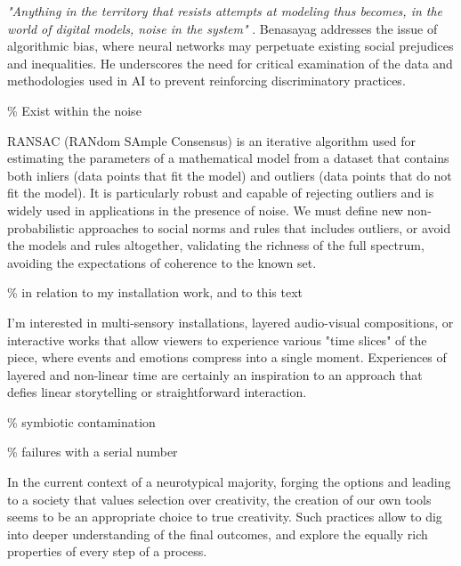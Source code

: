 \textit{"Anything in the territory that resists attempts at modeling thus becomes, in the world of digital models, noise in the system"} \citep{benasayag2019}. Benasayag addresses the issue of algorithmic bias, where neural networks may perpetuate existing social prejudices and inequalities. He underscores the need for critical examination of the data and methodologies used in AI to prevent reinforcing discriminatory practices.

{\scriptsize \textcolor{comment}{\% Exist within the noise }}

RANSAC (RANdom SAmple Consensus) is an iterative algorithm used for estimating the parameters of a mathematical model from a dataset that contains both inliers (data points that fit the model) and outliers (data points that do not fit the model). It is particularly robust and capable of rejecting outliers and is widely used in applications in the presence of noise. We must define new non-probabilistic approaches to social norms and rules that includes outliers, or avoid the models and rules altogether, validating the richness of the full spectrum, avoiding the expectations of coherence to the known set. 

{\scriptsize \textcolor{comment}{\% in relation to my installation work, and to this text}}

I'm interested in multi-sensory installations, layered audio-visual compositions, or interactive works that allow viewers to experience various "time slices" of the piece, where events and emotions compress into a single moment. Experiences of layered and non-linear time are certainly an inspiration to an approach that defies linear storytelling or straightforward interaction.


{\scriptsize \textcolor{comment}{\% symbiotic contamination}}

{\scriptsize \textcolor{comment}{\% failures with a serial number}}

In the current context of a neurotypical majority, forging the options and leading to a society that values selection over creativity, the creation of our own tools seems to be an appropriate choice to true creativity. Such practices allow to dig into deeper understanding of the final outcomes, and explore the equally rich properties of every step of a process.   

